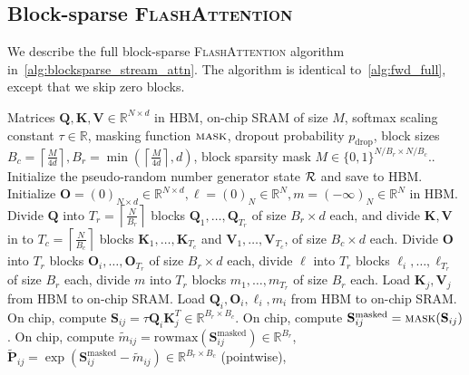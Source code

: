 \documentclass{article}
\newcommand{\vQ}{\mathbf{Q}}
\newcommand{\vK}{\mathbf{K}}
\newcommand{\vV}{\mathbf{V}}
\newcommand{\vS}{\mathbf{S}}
\newcommand{\vP}{\mathbf{P}}
\newcommand{\vO}{\mathbf{O}}
\newcommand{\sysname}{\textsc{FlashAttention}\xspace}
\begin{document}
\subsection{Block-sparse \sysname}
\label{subsec:block_sparse_details}

We describe the full block-sparse \sysname algorithm
in~\cref{alg:blocksparse_stream_attn}.
The algorithm is identical to~\cref{alg:fwd_full}, except that we skip zero blocks.
\iftoggle{arxiv}{
\begin{algorithm}[h]
} {
\begin{algorithm}[h]
}
  \caption{\small\label{alg:blocksparse_stream_attn}Block-Sparse \sysname Forward Pass}
  \begin{algorithmic}[1]
    \REQUIRE Matrices $\vQ, \vK, \vV \in \mathbb{R}^{N \times d}$ in HBM, on-chip SRAM of
    size $M$, softmax scaling constant $\tau \in \mathbb{R}$, masking function
    $\textsc{mask}$, dropout probability $p_\mathrm{drop}$, block sizes
    $B_c = \left \lceil \frac{M}{4d} \right\rceil, B_r = \min\left( \left \lceil \frac{M}{4d} \right\rceil, d\right)$, block sparsity mask $M \in \{ 0, 1 \}^{N/B_r \times N/B_c}$..
    \STATE Initialize the pseudo-random number generator state ${\cal R}$ and save to HBM.
    \STATE Initialize $\vO = (0)_{N \times d} \in \mathbb{R}^{N \times d}, \ell = (0)_N \in \mathbb{R}^{N}, m = (-\infty)_N \in \mathbb{R}^{N}$ in HBM.
    \STATE Divide $\vQ$ into $T_r = \left\lceil\frac{N}{B_r} \right\rceil$ blocks $\vQ_1, \dots, \vQ_{T_r}$ of size $B_r \times d$ each,
    and divide $\vK, \vV$ in to $T_c = \left\lceil \frac{N}{B_c} \right\rceil$ blocks $\vK_1, \dots, \vK_{T_c}$ and
    $\vV_1, \dots, \vV_{T_c}$, of size $B_c \times d$ each.
    \STATE Divide $\vO$ into $T_r$ blocks $\vO_i, \dots, \vO_{T_r}$ of size
    $B_r \times d$ each, divide $\ell$ into $T_r$ blocks $\ell_i, \dots, \ell_{T_r}$ of size
    $B_r$ each, divide $m$ into $T_r$ blocks $m_1, \dots, m_{T_r}$ of size $B_r$ each.
      \STATE Load $\vK_j, \vV_j$ from HBM to on-chip SRAM.
        \STATE Load $\vQ_i, \vO_i, \ell_i, m_i$ from HBM to on-chip SRAM.
        \STATE On chip, compute $\vS_{ij} = \tau \vQ_i \vK_j^T \in \mathbb{R}^{B_r \times B_c}$.
        \STATE On chip, compute $\vS_{ij}^{\mathrm{masked}} = \textsc{mask}(\vS_{ij})$.
        \STATE On chip, compute $\tilde{m}_{ij} = \mathrm{rowmax}(\vS_{ij}^{\mathrm{masked}}) \in \mathbb{R}^{B_r}$, $\tilde{\vP}_{ij} = \exp(\vS_{ij}^{\mathrm{masked}} - \tilde{m}_{ij}) \in \mathbb{R}^{B_r \times B_c}$ (pointwise),

\end{algorithmic}
\end{document}
